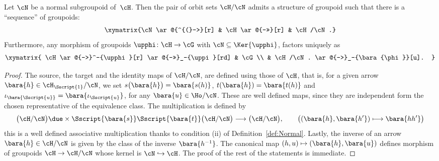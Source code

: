\begin{Proposition}\label{prop:quotient}Let $\cN$ be a normal subgroupoid of~$\cH$. Then the pair of orbit sets $\cH/\cN$ admits a structure of groupoid such that there is a ``sequence'' of groupoids:
\begin{gather*}
\xymatrix{\cN \ar@{^{(}->}[r] & \cH \ar@{->>}[r] & \cH/\cN.}
\end{gather*}
Furthermore, any morphism of groupoids $\upphi\colon \cH \to \cG$ with $\cN \subseteq \Ker{\upphi} $, factors uniquely as
\begin{gather*}
\xymatrix{ \cH \ar@{->}^-{\upphi}[r] \ar@{->>}_-{\uppi}[rd] & \cG
\\ & \cH/\cN. \ar@{-->}_-{\bara{\phi}}[u]. }
\end{gather*}
\end{Proposition}
\begin{proof}The source, the target and the identity maps of $\cH/\cN$, are defined using those of $\cH$, that is, for a given arrow $\bara{h} \in \cH_{\Sscript{1}}/\cN$, we set $s\big(\bara{h}\big)=\bara{s(h)}$, $t(\bara{h})=\bara{t(h)}$ and $\iota_{\bara {\Sscript{u}}}=\bara{\iota_{\Sscript{u}}}$, for any $\bara{u} \in \Ho/\cN$. These are well defined maps, since they are independent form the chosen representative of the equivalence class. The multiplication is defined by
\begin{gather*}
\big(\cH/\cN\big) \due \times { \Sscript{\bara{s}}} {\Sscript{\bara{t}}} \big(\cH/\cN\big) \longrightarrow\big(\cH/\cN\big), \qquad \big( (\bara{h}, \bara{h'}) \longmapsto \bara{hh'} \big)
\end{gather*}
this is a well defined associative multiplication thanks to condition (ii) of Definition~\ref{def:Normal}. Lastly, the inverse of an arrow $\bara{h} \in \cH/\cN$ is given by the class of the inverse $\bara{h^{-1}}$. The canonical map $(h,u) \mapsto (\bara{h}, \bara{u})$ defines morphism of groupoids $\cH \to \cH/\cN$ whose kernel is $\cN \hookrightarrow \cH$. The proof of the rest of the statements is immediate.
\end{proof}

